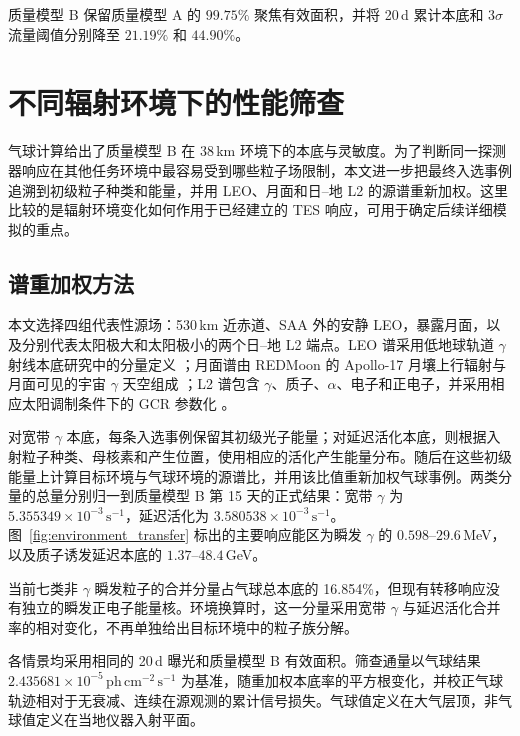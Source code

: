 \documentclass[11pt]{article}
\newcommand{\phcms}{\,\mathrm{ph\,cm^{-2}\,s^{-1}}}
\newcommand{\cps}{\,\mathrm{s^{-1}}}
\begin{document}
质量模型 B 保留质量模型 A 的 $99.75\%$ 聚焦有效面积，并将 20\,d 累计本底和 $3\sigma$ 流量阈值分别降至 $21.19\%$ 和 $44.90\%$。

\FloatBarrier

\section{不同辐射环境下的性能筛查}
\label{sec:environment_screening}

气球计算给出了质量模型 B 在 38\,km 环境下的本底与灵敏度。为了判断同一探测器响应在其他任务环境中最容易受到哪些粒子场限制，本文进一步把最终入选事例追溯到初级粒子种类和能量，并用 LEO、月面和日--地 L2 的源谱重新加权。这里比较的是辐射环境变化如何作用于已经建立的 TES 响应，可用于确定后续详细模拟的重点。

\subsection{谱重加权方法}

本文选择四组代表性源场：530\,km 近赤道、SAA 外的安静 LEO，暴露月面，以及分别代表太阳极大和太阳极小的两个日--地 L2 端点。LEO 谱采用低地球轨道 $\gamma$ 射线本底研究中的分量定义 \cite{Cumani2019LEO}；月面谱由 REDMoon 的 Apollo-17 月壤上行辐射与月面可见的宇宙 $\gamma$ 天空组成 \cite{Dobynde2021REDMoon}；L2 谱包含 $\gamma$、质子、$\alpha$、电子和正电子，并采用相应太阳调制条件下的 GCR 参数化 \cite{Lotti2021Athena,Usoskin2005,Kuznetsov2017}。

对宽带 $\gamma$ 本底，每条入选事例保留其初级光子能量；对延迟活化本底，则根据入射粒子种类、母核素和产生位置，使用相应的活化产生能量分布。随后在这些初级能量上计算目标环境与气球环境的源谱比，并用该比值重新加权气球事例。两类分量的总量分别归一到质量模型 B 第 15 天的正式结果：宽带 $\gamma$ 为 $5.355349\times10^{-3}\cps$，延迟活化为 $3.580538\times10^{-3}\cps$。图~\ref{fig:environment_transfer} 标出的主要响应能区为瞬发 $\gamma$ 的 $0.598$--$29.6$\,MeV，以及质子诱发延迟本底的 $1.37$--$48.4$\,GeV。

当前七类非 $\gamma$ 瞬发粒子的合并分量占气球总本底的 16.854\%，但现有转移响应没有独立的瞬发正电子能量核。环境换算时，这一分量采用宽带 $\gamma$ 与延迟活化合并率的相对变化，不再单独给出目标环境中的粒子族分解。

各情景均采用相同的 20\,d 曝光和质量模型 B 有效面积。筛查通量以气球结果 $2.435681\times10^{-5}\phcms$ 为基准，随重加权本底率的平方根变化，并校正气球轨迹相对于无衰减、连续在源观测的累计信号损失。气球值定义在大气层顶，非气球值定义在当地仪器入射平面。
\end{document}
